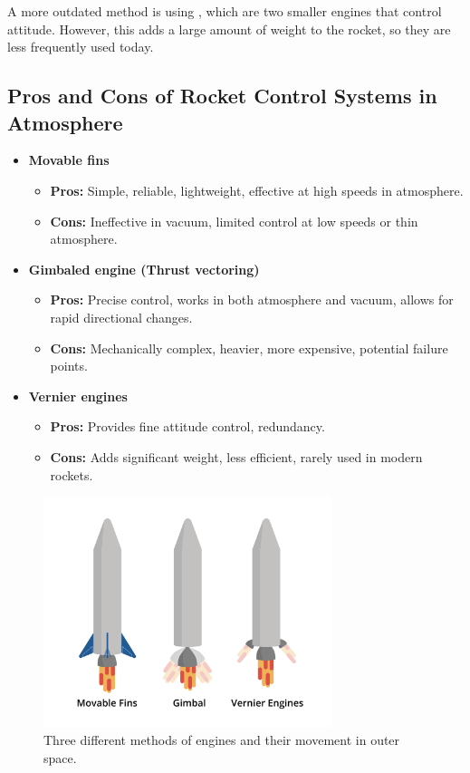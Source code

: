 	A more outdated method is using , which are two smaller engines that control attitude. However, this adds a large amount of weight to the rocket, so they are less frequently used today.

	\subsection*{Pros and Cons of Rocket Control Systems in Atmosphere}

	\begin{itemize}
		\item \textbf{Movable fins}
		\begin{itemize}
			\item \textbf{Pros:} Simple, reliable, lightweight, effective at high speeds in atmosphere.
			\item \textbf{Cons:} Ineffective in vacuum, limited control at low speeds or thin atmosphere.
		\end{itemize}
		\item \textbf{Gimbaled engine (Thrust vectoring)}
		\begin{itemize}
			\item \textbf{Pros:} Precise control, works in both atmosphere and vacuum, allows for rapid directional changes.
			\item \textbf{Cons:} Mechanically complex, heavier, more expensive, potential failure points.
		\end{itemize}
		\item \textbf{Vernier engines}
		\begin{itemize}
			\item \textbf{Pros:} Provides fine attitude control, redundancy.
			\item \textbf{Cons:} Adds significant weight, less efficient, rarely used in modern rockets.
		\end{itemize}
	\end{itemize}

\begin{figure}[htbp]
    \centering
	\includegraphics[width=0.75\textwidth]{control.png}
    \caption{Three different methods of engines and their movement in outer space.}
    \label{fig:atmoscontrol}
\end{figure}


